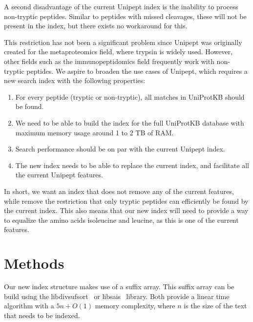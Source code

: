 \documentclass[10pt]{article}
\begin{document}
\begin{multicols}{2}
        A second disadvantage of the current Unipept index is the inability to process non-tryptic peptides.
        Similar to peptides with missed cleavages, these will not be present in the index, but there exists no workaround for this.

        This restriction has not been a significant problem since Unipept was originally created for the metaproteomics field, where trypsin is widely used.
        However, other fields such as the immunopeptidomics field frequently work with non-tryptic peptides.
        We aspire to broaden the use cases of Unipept, which requires a new search index with the following properties:

        \begin{enumerate}
            \item For every peptide (tryptic or non-tryptic), all matches in UniProtKB should be found.
            \item We need to be able to build the index for the full UniProtKB database with maximum memory usage around 1 to 2 TB of RAM\@.
            \item Search performance should be on par with the current Unipept index.
            \item The new index needs to be able to replace the current index, and facilitate all the current Unipept features.
        \end{enumerate}

        In short, we want an index that does not remove any of the current features, while remove the restriction that only tryptic peptides can efficiently be found by the current index.
        This also means that our new index will need to provide a way to equalize the amino acids isoleucine and leucine, as this is one of the current features.

        \section{Methods}\label{sec:methods}
        Our new index structure makes use of a suffix array.
        This suffix array can be build using the libdivsufsort~\cite{libdivsufsort} or libsais~\cite{libsais} library.
        Both provide a linear time algorithm with a $5n + O(1)$ memory complexity, where $n$ is the size of the text that needs to be indexed.


\end{multicols}
\end{document}
